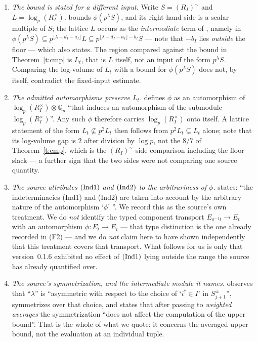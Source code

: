 \documentclass[11pt]{article}
\theoremstyle{plain}
\theoremstyle{definition}
\newcommand{\Ind}[1]{\textup{(Ind#1)}}
\begin{document}
\begin{enumerate}[label=(W\arabic*),leftmargin=3.2em,itemsep=3pt]
\item \emph{The bound is stated for a different input.}
 Write $S=(R_I)^{\sim}$ and $L=\log_p(R_I^{\times})$.
 \cite[Prop.~1.2(iii)]{IUT4} bounds $\phi(p^{\lambda}S)$, and its right-hand side
 is a scalar multiple of $S$; the lattice $L$ occurs as the \emph{intermediate}
 term of \cite[Prop.~1.2(ii)]{IUT4}, namely in
 $\phi(p^{\lambda}S)\subseteq p^{\lfloor\lambda-d_I-a_I\rfloor}L
 \subseteq p^{\lfloor\lambda-d_I-a_I\rfloor-b_I}S$ --- note that $-b_I$ lies 
 \emph{outside} the floor --- which
 \cite[Prop.~1.4(iii)]{IUT4} also states.  The region compared against the bound
 in Theorem~\ref{t:cmp} is $L_t$, that is $L$ itself, not an input of the form
 $p^{\lambda}S$.  Comparing the log-volume of $L_t$ with a bound for
 $\phi(p^{\lambda}S)$ does not, by itself, contradict the fixed-input estimate.
\item \emph{The admitted automorphisms preserve $L_t$.}
 \cite[Prop.~1.2]{IUT4} defines $\phi$ as an automorphism of
 $\log_p(R_I^{\times})\otimes\mathbb{Q}_p$ ``that induces an automorphism of the
 submodule $\log_p(R_I^{\times})$''.  Any such $\phi$ therefore carries
 $\log_p(R_I^{\times})$ onto itself.  A lattice statement of the form
 $L_t\not\subseteq p^2L_t$ then follows from $p^2L_t\subsetneq L_t$ alone; note
 that its log-volume gap is $2$ after division by $\log p$, not the $8/7$ of
 Theorem~\ref{t:cmp}, which is
 the $(R_I)^{\sim}$-side comparison including the floor slack --- a further sign
 that the two sides were not comparing one source quantity.
\item \emph{The source attributes $\Ind1$ and $\Ind2$ to the arbitrariness of
 $\phi$.}  \cite[Thm.~1.10, proof, Step~(v)]{IUT4} states: ``the indeterminacies
 (Ind1) and (Ind2) are taken into account by the arbitrary nature of the
 automorphism `$\phi$' ''.  We record this as the source's own treatment.  We do
 \emph{not} identify the typed component transport $E_{\sigma^{-1}t}\to E_t$
 with an automorphism $\phi:E_t\to E_t$ --- that type distinction is the one
 already recorded in \textup{(F2)} --- and we do \emph{not} claim here to have
 shown independently that this treatment covers that transport.  What follows
 for us is only that version~0.1.6 exhibited no effect of $\Ind1$ lying outside
 the range the source has already quantified over.
\item \emph{The source's symmetrization, and the intermediate module it names.}
 \cite[Thm.~1.10, proof]{IUT4} observes that ``$\lambda$'' is ``asymmetric with
 respect to the choice of `$i^{\dagger}\in I$' in $S^{\pm}_{j+1}$'', symmetrizes
 over that choice, and states that after passing to \emph{weighted averages} the
 symmetrization ``does not affect the computation of the upper bound''.  That is
 the whole of what we quote: it concerns the averaged upper bound, not the
 evaluation at an individual tuple.


\end{enumerate}
\end{document}
